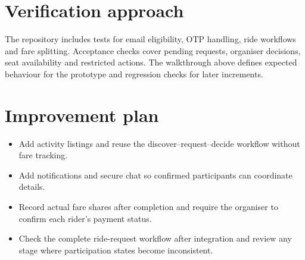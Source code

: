 \documentclass[10pt,a4paper]{article}
\begin{document}
\section{Verification approach}
The repository includes tests for email eligibility, OTP handling, ride workflows and fare splitting. Acceptance checks cover pending requests, organiser decisions, seat availability and restricted actions. The walkthrough above defines expected behaviour for the prototype and regression checks for later increments.

\section{Improvement plan}
\begin{itemize}
\item Add activity listings and reuse the discover--request--decide workflow without fare tracking.
\item Add notifications and secure chat so confirmed participants can coordinate details.
\item Record actual fare shares after completion and require the organiser to confirm each rider's payment status.
\item Check the complete ride-request workflow after integration and review any stage where participation states become inconsistent.
\end{itemize}
\end{document}
